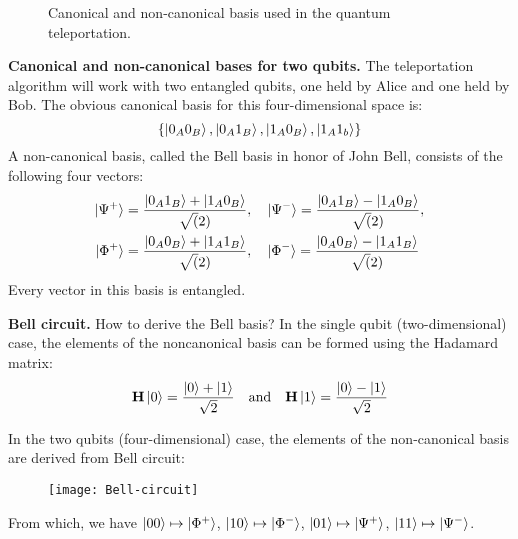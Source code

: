 \documentclass{easyclass}
\begin{document}
\begin{figure}[h]
	\centering
	\hspace{0.2\textwidth}
	\caption{Canonical and non-canonical basis used in the quantum teleportation.}
	\label{fig:canonical-non-canonical-bases}
\end{figure}

\textbf{Canonical and non-canonical bases for two qubits.} The teleportation algorithm will work with two entangled qubits, one held by Alice and one held by Bob. The obvious canonical basis for this four-dimensional space is:
\begin{equation}
	\{\ket{0_A 0_B}, \ket{0_A 1_B}, \ket{1_A 0_B}, \ket{1_A 1_b}\}
\end{equation}
A non-canonical basis, called the Bell basis in honor of John Bell, consists of the
following four vectors:
\begin{equation}
	\begin{aligned}
		\ket{\Psi^+}&=\frac{\ket{0_A 1_B}+\ket{1_A 0_B}}{\sqrt(2)},\quad
		\ket{\Psi^-}=\frac{\ket{0_A 1_B}-\ket{1_A 0_B}}{\sqrt(2)},\\
		\ket{\Phi^+}&=\frac{\ket{0_A 0_B}+\ket{1_A 1_B}}{\sqrt(2)},\quad
		\ket{\Phi^-}=\frac{\ket{0_A 0_B}-\ket{1_A 1_B}}{\sqrt(2)}
	\end{aligned}
\end{equation}
Every vector in this basis is entangled.

\textbf{Bell circuit.} How to derive the Bell basis? In the single qubit (two-dimensional) case, the elements of the noncanonical basis can be formed using the Hadamard matrix:
\begin{equation}
	\mathbf{H}\ket{0} = \frac{\ket{0}+\ket{1}}{\sqrt{2}}\quad \textrm{and}\quad \mathbf{H}\ket{1} = \frac{\ket{0}-\ket{1}}{\sqrt{2}}
\end{equation}

In the two qubits (four-dimensional) case, the elements of the non-canonical basis are derived from Bell circuit:
\begin{figure}[h]
	\centering
	\texttt{[image: Bell-circuit]}
	\label{fig:Bell-circuit}
\end{figure}

From which, we have $\ket{00}\mapsto\ket{\Phi^+}$, $\ket{10}\mapsto\ket{\Phi^-}$, $\ket{01}\mapsto\ket{\Psi^+}$, $\ket{11}\mapsto\ket{\Psi^-}$.
\end{document}

